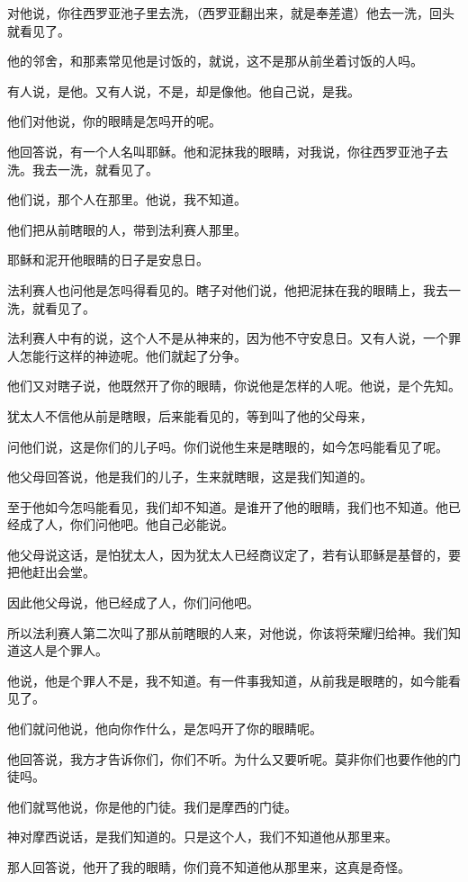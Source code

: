 \documentclass[12pt,oneside]{book}
\begin{document}
对他说，你往西罗亚池子里去洗，（西罗亚翻出来，就是奉差遣）他去一洗，回头就看见了。

他的邻舍，和那素常见他是讨饭的，就说，这不是那从前坐着讨饭的人吗。

有人说，是他。又有人说，不是，却是像他。他自己说，是我。

他们对他说，你的眼睛是怎吗开的呢。

他回答说，有一个人名叫耶稣。他和泥抹我的眼睛，对我说，你往西罗亚池子去洗。我去一洗，就看见了。

他们说，那个人在那里。他说，我不知道。

他们把从前瞎眼的人，带到法利赛人那里。

耶稣和泥开他眼睛的日子是安息日。

法利赛人也问他是怎吗得看见的。瞎子对他们说，他把泥抹在我的眼睛上，我去一洗，就看见了。

法利赛人中有的说，这个人不是从神来的，因为他不守安息日。又有人说，一个罪人怎能行这样的神迹呢。他们就起了分争。

他们又对瞎子说，他既然开了你的眼睛，你说他是怎样的人呢。他说，是个先知。

犹太人不信他从前是瞎眼，后来能看见的，等到叫了他的父母来，

问他们说，这是你们的儿子吗。你们说他生来是瞎眼的，如今怎吗能看见了呢。

他父母回答说，他是我们的儿子，生来就瞎眼，这是我们知道的。

至于他如今怎吗能看见，我们却不知道。是谁开了他的眼睛，我们也不知道。他已经成了人，你们问他吧。他自己必能说。

他父母说这话，是怕犹太人，因为犹太人已经商议定了，若有认耶稣是基督的，要把他赶出会堂。

因此他父母说，他已经成了人，你们问他吧。

所以法利赛人第二次叫了那从前瞎眼的人来，对他说，你该将荣耀归给神。我们知道这人是个罪人。

他说，他是个罪人不是，我不知道。有一件事我知道，从前我是眼瞎的，如今能看见了。

他们就问他说，他向你作什么，是怎吗开了你的眼睛呢。

他回答说，我方才告诉你们，你们不听。为什么又要听呢。莫非你们也要作他的门徒吗。

他们就骂他说，你是他的门徒。我们是摩西的门徒。

神对摩西说话，是我们知道的。只是这个人，我们不知道他从那里来。

那人回答说，他开了我的眼睛，你们竟不知道他从那里来，这真是奇怪。
\end{document}
